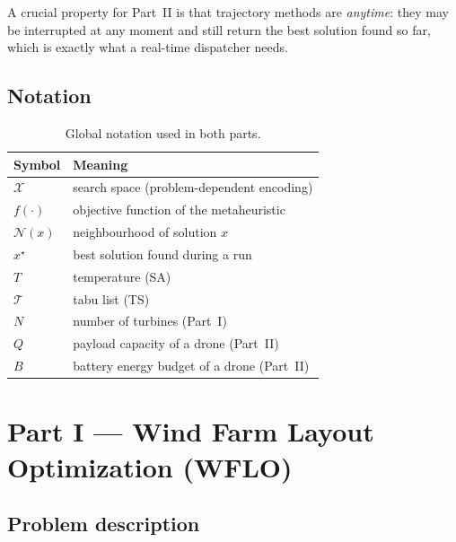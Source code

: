 \documentclass[11pt,a4paper]{article}
\begin{document}
A crucial property for Part~II is that trajectory methods are
\emph{anytime}: they may be interrupted at any moment and still return the best
solution found so far, which is exactly what a real-time dispatcher needs.

\subsection{Notation}

\begin{table}[H]
\centering
\caption{Global notation used in both parts.}
\label{tab:notation}
\begin{tabular}{@{}ll@{}}
\toprule
Symbol & Meaning \\
\midrule
$\mathcal{X}$            & search space (problem-dependent encoding) \\
$f(\cdot)$               & objective function of the metaheuristic \\
$\mathcal{N}(x)$         & neighbourhood of solution $x$ \\
$x^{\star}$              & best solution found during a run \\
$T$                      & temperature (SA) \\
$\mathcal{T}$            & tabu list (TS) \\
$N$                      & number of turbines (Part~I) \\
$Q$                      & payload capacity of a drone (Part~II) \\
$B$                      & battery energy budget of a drone (Part~II) \\
\bottomrule
\end{tabular}
\end{table}

\section{Part I --- Wind Farm Layout Optimization (WFLO)}

\subsection{Problem description}
\end{document}
